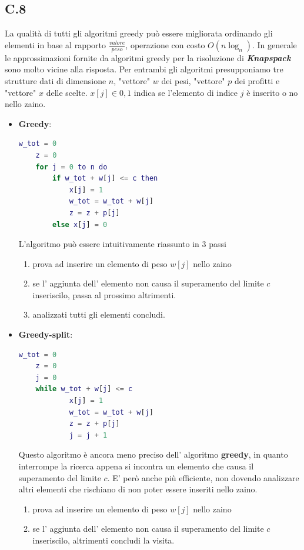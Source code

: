 \documentclass[a4paper]{article}
\newcommand{\imp}[1]{\textbf{\textit{#1}}}
\begin{document}
\subsection{C.8}
La qualità di tutti gli algoritmi greedy può essere migliorata ordinando gli elementi in base al rapporto $\frac{valore}{peso}$, operazione con costo $O(n\log_n)$.
In generale le approssimazioni fornite da algoritmi greedy per la risoluzione di \imp{Knapspack} sono molto vicine alla risposta. %
Per entrambi gli algoritmi presupponiamo tre strutture dati di dimensione $n$, "vettore" $w$ dei pesi, "vettore" $p$ dei profitti e "vettore" $x$ delle scelte. $x[j] \in {0,1}$ indica se l'elemento di indice $j$ è inserito o no nello zaino.
\begin{itemize}
	\item \textbf{Greedy}: 
		\begin{lstlisting}[language=Matlab]
	w_tot = 0
	z = 0
	for j = 0 to n do
		if w_tot + w[j] <= c then
			x[j] = 1
			w_tot = w_tot + w[j]
			z = z + p[j]
		else x[j] = 0
		\end{lstlisting}
		L'algoritmo può essere intuitivamente riassunto in 3 passi
		\begin{enumerate}
			\item prova ad inserire un elemento di peso $w[j]$ nello zaino
			\item se l' aggiunta dell' elemento non causa il superamento del limite $c$ inseriscilo, passa al prossimo altrimenti.
			\item analizzati tutti gli elementi concludi.
		\end{enumerate}
	\item \textbf{Greedy-split}:
		\begin{lstlisting}[language=Matlab]
	w_tot = 0
	z = 0
	j = 0
	while w_tot + w[j] <= c
			x[j] = 1
			w_tot = w_tot + w[j]
			z = z + p[j]
			j = j + 1
		\end{lstlisting}
		Questo algoritmo è ancora meno preciso dell' algoritmo \textbf{greedy}, in quanto interrompe la ricerca appena si incontra un elemento che causa il superamento del limite $c$.
		E' però anche più efficiente, non dovendo analizzare altri elementi che rischiano di non poter essere inseriti nello zaino.
		\begin{enumerate}
			\item prova ad inserire un elemento di peso $w[j]$ nello zaino
			\item se l' aggiunta dell' elemento non causa il superamento del limite $c$ inseriscilo, altrimenti concludi la visita.
		\end{enumerate}
\end{itemize}
\end{document}
